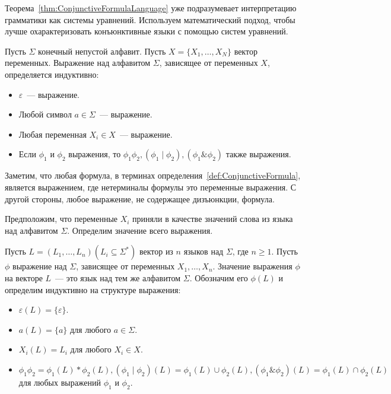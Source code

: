 Теорема~\ref{thm:ConjunctiveFormulaLanguage} уже подразумевает интерпретацию грамматики как системы уравнений. Используем математический подход, чтобы лучше охарактеризовать конъюнктивные языки с помощью систем уравнений.

\begin{definition}[Выражение]
    Пусть $\Sigma$ конечный непустой алфавит. Пусть $X = \{X_1,\ldots,X_N\}$ вектор переменных. Выражение над алфавитом $\Sigma$, зависящее от переменных $X$, определяется индуктивно:
    \begin{itemize}
       \item $\varepsilon$~--- выражение.
       \item Любой символ $a\in\Sigma$~--- выражение.
       \item Любая переменная $X_i\in X$~--- выражение.
       \item Если $\phi_1$ и $\phi_2$ выражения, то $\phi_1\phi_2, (\phi_1\mid\phi_2), (\phi_1\&\phi_2)$ также выражения.
    \end{itemize}
\end{definition}

Заметим, что любая формула, в терминах определения~\ref{def:ConjunctiveFormula}, является выражением, где нетерминалы формулы это переменные выражения. С другой стороны, любое выражение, не содержащее дизъюнкции, формула.

Предположим, что переменные $X_i$ приняли в качестве значений слова из языка над алфавитом $\Sigma$. Определим значение всего выражения.

\begin{definition}\label{def:ConjunctiveExpressionValue}
    Пусть $L = (L_1,\ldots,L_n) (L_i \subseteq \Sigma^*)$ вектор из $n$ языков над $\Sigma$, где $n \geqslant 1$. Пусть $\phi$ выражение над $\Sigma$, зависящее от переменных $X_1,\ldots,X_n$. Значение выражения $\phi$ на векторе $L$~--- это язык над тем же алфавитом $\Sigma$. Обозначим его $\phi(L)$ и определим индуктивно на структуре выражения:
    \begin{itemize}
       \item $\varepsilon(L) = \{\varepsilon\}$.
       \item $a(L) = \{a\}$ для любого $a\in\Sigma$.
       \item $X_i(L) = L_i$ для любого $X_i \in X$.
       \item $\phi_1\phi_2 = \phi_1(L) * \phi_2(L), (\phi_1\mid\phi_2)(L) = \phi_1(L) \cup \phi_2(L), (\phi_1\&\phi_2)(L) = \phi_1(L) \cap \phi_2(L)$ для любых выражений $\phi_1$ и $\phi_2$.
    \end{itemize}
\end{definition}

